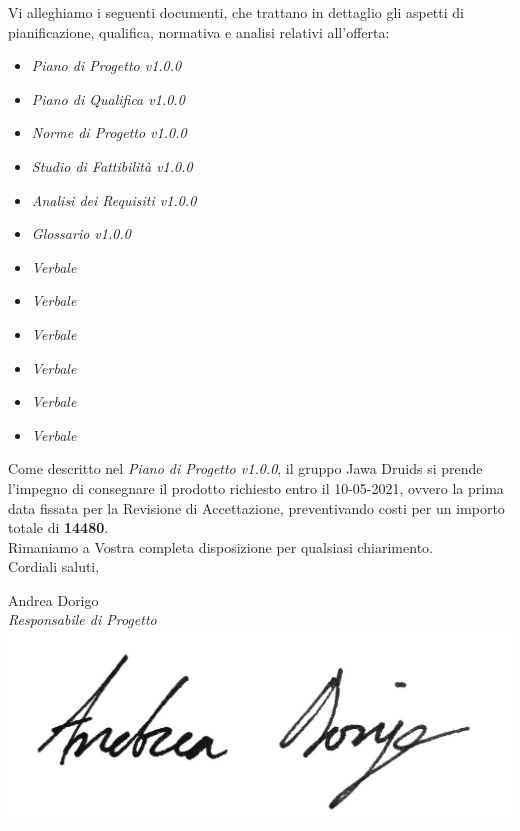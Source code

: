 \documentclass[a4paper,12pt]{report}
\begin{document}
Vi alleghiamo i seguenti documenti, che trattano in dettaglio gli aspetti di pianificazione, qualifica, normativa e analisi relativi all'offerta:
\begin{itemize}
  \item \textit{Piano di Progetto v1.0.0}
  \item \textit{Piano di Qualifica v1.0.0}
  \item \textit{Norme di Progetto v1.0.0}
  \item \textit{Studio di Fattibilità v1.0.0}
  \item \textit{Analisi dei Requisiti v1.0.0}
  \item \textit{Glossario v1.0.0}
  \item \textit{Verbale}
  \item \textit{Verbale}
  \item \textit{Verbale}
  \item \textit{Verbale}
  \item \textit{Verbale}
  \item \textit{Verbale}
\end{itemize}

Come descritto nel \textit{Piano di Progetto v1.0.0}, il gruppo Jawa Druids si prende l’impegno di consegnare il prodotto richiesto entro il 10-05-2021, ovvero la prima data fissata per
la Revisione di Accettazione, preventivando costi per un importo totale di \textbf{14480\texteuro}.\\
Rimaniamo a Vostra completa disposizione per qualsiasi chiarimento.\\
\vspace{0.3cm}
Cordiali saluti,
\begin{flushright}
  Andrea Dorigo \\
  \textit{Responsabile di Progetto} \\
  \includegraphics[width=0.3\linewidth]{immagini/firme/andrea_dorigo.jpg}\\[4ex]
\end{flushright}
\end{document}
